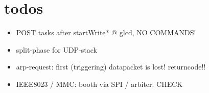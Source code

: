
\chapter{todos} \label{chapter:todos}

\begin{itemize}
 \item POST tasks after startWrite* @ glcd, NO COMMANDS!
 \item split-phase for UDP-stack
 \item arp-request: first (triggering) datapacket is lost! returncode!!
 \item IEEE8023 / MMC: booth via SPI / arbiter. CHECK
\end{itemize}


